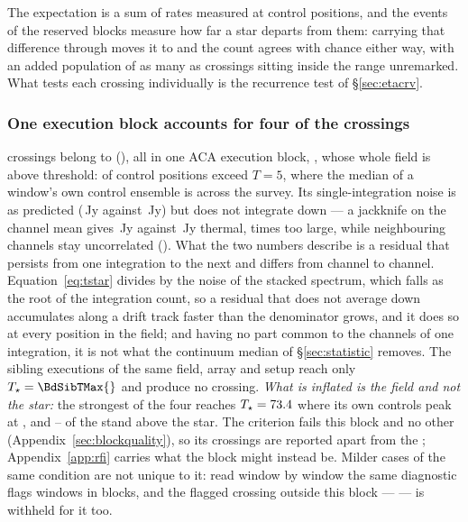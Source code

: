 The expectation is a sum of rates measured at control positions, and the
\StHoObs{} events of the reserved blocks measure how far a star departs from
them: carrying that difference through moves it to \CeExpX{} and the count
agrees with chance either way, with an added population of as many as
\CeAddBlind{} crossings sitting inside the range unremarked. What tests each
crossing individually is the
recurrence test of \S\ref{sec:etacrv}.

\subsubsection{One execution block accounts for four of the crossings}
\label{sec:bdblock}

\BdNCross{} crossings belong to \BdStar{} (\BdAlias), all in one ACA execution
block, \texttt{\BdBlock}, whose whole field is above threshold:
\BdNCtrlAbove{} of \BdNCtrl{} control positions exceed $T=5$, where the median
of a window's own control ensemble is \BdSurvCtrlMed{} across the survey. Its single-integration noise is as
predicted (\BdRmsMeas\,Jy against \BdRmsPred\,Jy) but does not integrate down
--- a jackknife on the channel mean gives \BdJack\,Jy against
\BdThermal\,Jy thermal, \BdJackRatio{} times too large, while neighbouring
channels stay uncorrelated (\BdChanCorr). What the two numbers describe is a
residual that persists from one integration to the next and differs from
channel to channel. Equation~\ref{eq:tstar} divides by the noise of the
stacked spectrum, which falls as the root of the integration count, so a
residual that does not average down accumulates along a drift track faster
than the denominator grows, and it does so at every position in the field; and
having no part common to the channels of one integration, it is not what the
continuum median of \S\ref{sec:statistic} removes. The \BdNSibling{}
sibling executions of the same field, array and setup reach only
$T_\star=\BdSibTMax{}$ and produce no crossing. \emph{What is inflated is the
field and not the star:} the strongest of the four reaches
$T_\star=73.4$ where its own controls peak at \EvFlagCtrlAtHi, and
\EvFlagNgeLo--\EvFlagNgeHi{} of the \BdNCtrl{} stand above the star. The
criterion fails this block and no other
(Appendix~\ref{sec:blockquality}), so its \BdNCross{} crossings are reported
apart from the \EvNCrossQp{}; Appendix~\ref{app:rfi} carries what the block
might instead be. Milder cases of the same condition are not unique to it:
read window by window the same diagnostic flags \DqNWin{} windows in
\BkFlagNBlock{} blocks, and the \BkFlagNCrossOther{} flagged crossing outside
this block --- \BkFlagOtherStar{} --- is withheld for it too.

